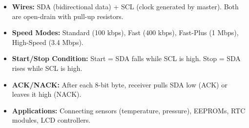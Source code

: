 \documentclass[12pt,a4paper]{article}
\begin{document}
\begin{itemize}[leftmargin=*, itemsep=3pt]
  \item \textbf{Wires:} SDA (bidirectional data) + SCL (clock generated by master). Both are open-drain with pull-up resistors.
  \item \textbf{Speed Modes:} Standard (100 kbps), Fast (400 kbps), Fast-Plus (1 Mbps), High-Speed (3.4 Mbps).
  \item \textbf{Start/Stop Condition:} Start = SDA falls while SCL is high. Stop = SDA rises while SCL is high.
  \item \textbf{ACK/NACK:} After each 8-bit byte, receiver pulls SDA low (ACK) or leaves it high (NACK).
  \item \textbf{Applications:} Connecting sensors (temperature, pressure), EEPROMs, RTC modules, LCD controllers.
\end{itemize}
\end{document}
